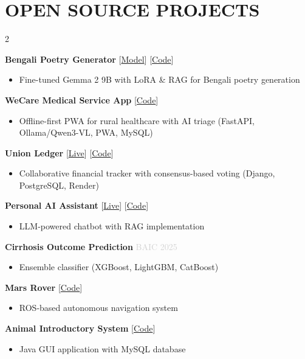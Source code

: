 \documentclass[a4paper,10pt]{article}
\begin{document}
\section*{OPEN SOURCE PROJECTS}
\vspace{-0.2cm}
\begin{multicols}{2}

\textbf{Bengali Poetry Generator} \hfill [\href{https://huggingface.co/samim-reza/KobitaLM}{\color{maincolor}Model}] [\href{https://github.com/samim-reza/KobitaLM}{\color{maincolor}Code}]
\begin{itemize}
    \item Fine-tuned Gemma 2 9B with LoRA \& RAG for Bengali poetry generation
\end{itemize}

\textbf{WeCare Medical Service App} \hfill [\href{https://github.com/samim-reza/FutureBuilders2025_GreenU_Tensors}{\color{maincolor}Code}]
\begin{itemize}
    \item Offline-first PWA for rural healthcare with AI triage (FastAPI, Ollama/Qwen3-VL, PWA, MySQL)
\end{itemize}

\textbf{Union Ledger} \hfill [\href{https://samim-reza.github.io/union}{\color{maincolor}Live}] [\href{https://github.com/samim-reza/union}{\color{maincolor}Code}]
\begin{itemize}
    \item Collaborative financial tracker with consensus-based voting (Django, PostgreSQL, Render)
\end{itemize}

\columnbreak

\textbf{Personal AI Assistant} \hfill [\href{https://samim-chatbot-app.azurewebsites.net/}{\color{maincolor}Live}] [\href{https://github.com/samim-reza/MyChatBot}{\color{maincolor}Code}]
\begin{itemize}
    \item LLM-powered chatbot with RAG implementation
\end{itemize}

\textbf{Cirrhosis Outcome Prediction} \hfill \textcolor{lightgray}{BAIC 2025}
\begin{itemize}
    \item Ensemble classifier (XGBoost, LightGBM, CatBoost)
\end{itemize}

\textbf{Mars Rover} \hfill [\href{https://github.com/samim-reza/Rover-robot}{\color{maincolor}Code}]
\begin{itemize}
    \item ROS-based autonomous navigation system
\end{itemize}

\textbf{Animal Introductory System} \hfill [\href{https://github.com/samim-reza/Animal_Introductory}{\color{maincolor}Code}]
\begin{itemize}
    \item Java GUI application with MySQL database
\end{itemize}

\end{multicols}
\end{document}

